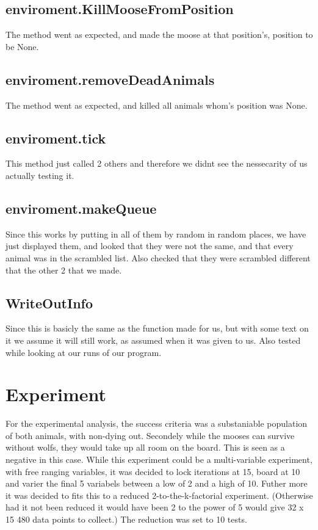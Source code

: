 \documentclass{article}
\begin{document}
    \subsection{enviroment.KillMooseFromPosition}
    The method went as expected, and made the moose at that position's, position to be None.
    
    \subsection{enviroment.removeDeadAnimals}
    The method went as expected, and killed all animals whom's position was None.
    
    \subsection{enviroment.tick}
    This method just called 2 others and therefore we didnt see the nessecarity of us actually testing it.
    
    \subsection{enviroment.makeQueue}
    Since this works by putting in all of them by random in random places, we have just displayed them, and looked that they were not the same, and that every animal was in the scrambled list. Also checked that they were scrambled different that the other 2 that we made.
    
    \subsection{WriteOutInfo}
    Since this is basicly the same as the function made for us, but with some text on it we assume it will still work, as assumed when it was given to us. Also tested while looking at our runs of our program.
    
    \section{Experiment}
    For the experimental analysis, the success criteria was a substaniable population of both animals, with non-dying out. Secondely while the mooses can survive without wolfs, they would take up all room on the board. This is seen as a negative in this case. \newline
    While this experiment could be a multi-variable experiment, with free ranging variables, it was decided to lock iterations at 15, board at 10 and varier the final 5 variabels between a low of 2 and a high of 10. Futher more it was decided to fits this to a reduced 2-to-the-k-factorial experiment. (Otherwise had it not been reduced it would have been 2 to the power of 5 would give 32 x 15 480 data points to collect.) The reduction was set to 10 tests. 
    
\end{document}
